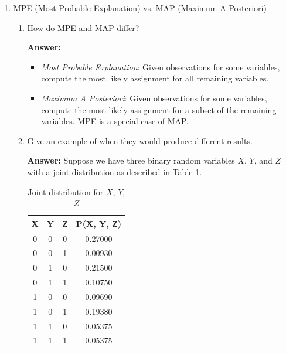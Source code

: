 \documentclass{article}
\newenvironment{QandA}{\begin{enumerate}[label=\arabic*.]}{\end{enumerate}}
\newenvironment{InnerQandA}{\begin{enumerate}[label=\roman*.]}{\end{enumerate}}
\newenvironment{answer}{\par\normalfont \textbf{Answer:}}{}
\begin{document}
\begin{QandA}
\begin{answer}
        (Source: \href{https://en.wikipedia.org/wiki/Kullback%E2%80%93Leibler_divergence}{Wikipedia}, \href{https://ai.stackexchange.com/questions/18019/why-does-the-kl-divergence-not-satisfy-the-triangle-inequality}{StackExchange})
    \end{answer}

    \item MPE (Most Probable Explanation) vs. MAP (Maximum A Posteriori)
    \begin{InnerQandA}
        \item How do MPE and MAP differ?
        \begin{answer}
            \begin{itemize}
                \item \textit{Most Probable Explanation}: Given observations for some variables, compute the most likely assignment for all remaining variables. 
                \item \textit{Maximum A Posteriori}: Given observations for some variables, compute the most likely assignment for a subset of the remaining variables. MPE is a special case of MAP.
            \end{itemize}
        \end{answer}

        \item Give an example of when they would produce different results.
        \begin{answer}
            Suppose we have three binary random variables $X$, $Y$, and $Z$ with a joint distribution as described in Table \ref{tab:joint-binary-vars}.
            \begin{table}[h!]
            \centering
            \begin{tabular}{|c|c|c|c|}
            \hline
            \textbf{X} & \textbf{Y} & \textbf{Z} & \textbf{P(X, Y, Z)} \\ \hline
            0          & 0          & 0          & 0.27000             \\ \hline
            0          & 0          & 1          & 0.00930             \\ \hline
            0          & 1          & 0          & 0.21500             \\ \hline
            0          & 1          & 1          & 0.10750             \\ \hline
            1          & 0          & 0          & 0.09690             \\ \hline
            1          & 0          & 1          & 0.19380             \\ \hline
            1          & 1          & 0          & 0.05375             \\ \hline
            1          & 1          & 1          & 0.05375             \\ \hline
            \end{tabular}
            \caption{Joint distribution for $X$, $Y$, $Z$}
            \label{tab:joint-binary-vars}
            \end{table}


\end{answer}
\end{InnerQandA}
\end{QandA}
\end{document}
